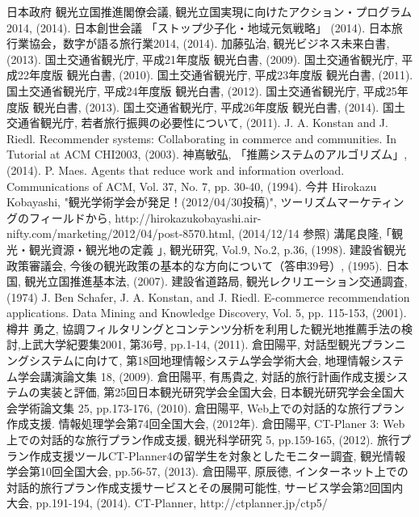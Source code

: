 
\begin{thebibliography}{report}
 日本政府 観光立国推進閣僚会議, 観光立国実現に向けたアクション・プログラム2014, (2014).
 日本創世会議 「ストップ少子化・地域元気戦略」 (2014).
 日本旅行業協会，数字が語る旅行業2014, (2014).
 加藤弘治, 観光ビジネス未来白書, (2013).
 国土交通省観光庁, 平成21年度版 観光白書, (2009).
 国土交通省観光庁, 平成22年度版 観光白書, (2010).
 国土交通省観光庁, 平成23年度版 観光白書, (2011).
 国土交通省観光庁, 平成24年度版 観光白書, (2012).
 国土交通省観光庁, 平成25年度版 観光白書, (2013).
 国土交通省観光庁, 平成26年度版 観光白書, (2014).
 国土交通省観光庁, 若者旅行振興の必要性について, (2011).
 J. A. Konstan and J. Riedl. Recommender systems: Collaborating in commerce and communities. In Tutorial at ACM CHI2003, (2003).
 神嶌敏弘, 「推薦システムのアルゴリズム」, (2014).
 P. Maes. Agents that reduce work and information overload. Communications of ACM, Vol. 37, No. 7, pp. 30-40, (1994).
 今井
 Hirokazu Kobayashi, "観光学術学会が発足！(2012/04/30投稿)", ツーリズムマーケティングのフィールドから, http://hirokazukobayashi.air-nifty.com/marketing/2012/04/post-8570.html, (2014/12/14 参照)
 溝尾良隆, ｢観光・観光資源・観光地の定義 ｣, 観光研究, Vol.9, No.2, p.36, (1998).
 建設省観光政策審議会, 今後の観光政策の基本的な方向について（答申39号）, (1995).
 日本国, 観光立国推進基本法, (2007).
 建設省道路局, 観光レクリエーション交通調査, (1974)
 J. Ben Schafer, J. A. Konstan, and J. Riedl. E-commerce recommendation applications. Data Mining and Knowledge Discovery, Vol. 5, pp. 115-153, (2001).
 樽井 勇之, 協調フィルタリングとコンテンツ分析を利用した観光地推薦手法の検討,上武大学紀要集2001, 第36号, pp.1-14, (2011).
 倉田陽平, 対話型観光プランニングシステムに向けて, 第18回地理情報システム学会学術大会, 地理情報システム学会講演論文集 18, (2009).
 倉田陽平, 有馬貴之, 対話的旅行計画作成支援システムの実装と評価, 第25回日本観光研究学会全国大会, 日本観光研究学会全国大会学術論文集 25, pp.173-176, (2010).
 倉田陽平, Web上での対話的な旅行プラン作成支援. 情報処理学会第74回全国大会, (2012年).
 倉田陽平, CT-Planer 3: Web上での対話的な旅行プラン作成支援, 観光科学研究 5, pp.159-165, (2012). 
 旅行プラン作成支援ツールCT-Planner4の留学生を対象としたモニター調査, 観光情報学会第10回全国大会, pp.56-57, (2013).
 倉田陽平, 原辰徳, インターネット上での対話的旅行プラン作成支援サービスとその展開可能性, サービス学会第2回国内大会, pp.191-194, (2014).
 CT-Planner, http://ctplanner.jp/ctp5/
\end{thebibliography}
